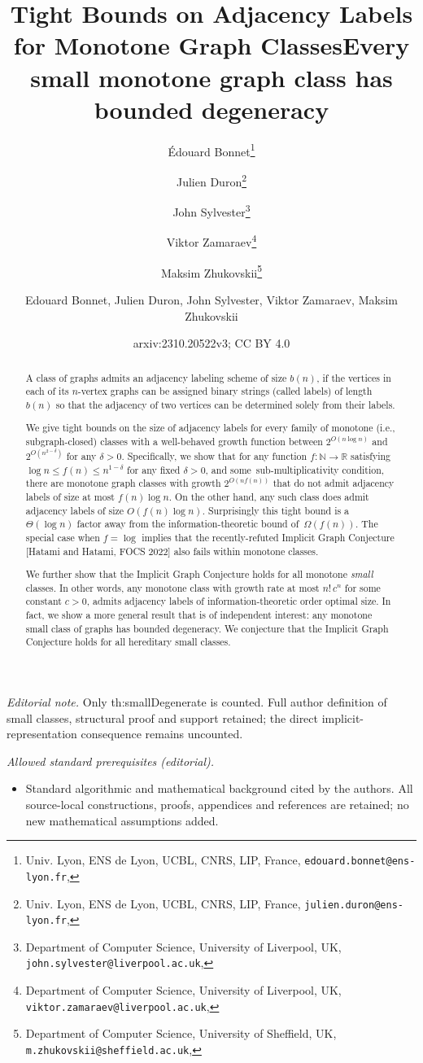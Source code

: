 \documentclass[letterpaper,11pt]{article}
\title{Tight Bounds on Adjacency Labels for Monotone Graph Classes}
\date{}
\author{ }
\author{{\'E}douard Bonnet\thanks{Univ. Lyon, ENS de Lyon, UCBL, CNRS, LIP, France,  \texttt{edouard.bonnet@ens-lyon.fr}, \orcidlink{0000-0002-1653-5822}}    \and Julien Duron\thanks{Univ. Lyon, ENS de Lyon, UCBL, CNRS, LIP, France, \texttt{julien.duron@ens-lyon.fr}, \orcidlink{0009-0004-0925-9438}} \and    John Sylvester\thanks{Department of Computer Science, University of Liverpool, UK, \texttt{john.sylvester@liverpool.ac.uk}, \orcidlink{0000-0002-6543-2934}}
	\and
	Viktor Zamaraev\thanks{Department of Computer Science, University of Liverpool, UK, \texttt{viktor.zamaraev@liverpool.ac.uk}, \orcidlink{0000-0001-5755-4141}}
	\and Maksim Zhukovskii\thanks{Department of Computer Science, University of Sheffield, UK, \texttt{m.zhukovskii@sheffield.ac.uk}, \orcidlink{0000-0001-8763-9533} }}
\title{Every small monotone graph class has bounded degeneracy}
\author{Edouard Bonnet, Julien Duron, John Sylvester, Viktor Zamaraev, Maksim Zhukovskii}
\date{arxiv:2310.20522v3; CC BY 4.0}
\theoremstyle{definition}
\theoremstyle{remark}
\begin{document}
\maketitle
\noindent\textit{Editorial note.} Only th:smallDegenerate is counted. Full author definition of small classes, structural proof and support retained; the direct implicit-representation consequence remains uncounted.\par\medskip
\noindent\textit{Allowed standard prerequisites (editorial).}\begin{itemize}
\item Standard algorithmic and mathematical background cited by the authors. All source-local constructions, proofs, appendices and references are retained; no new mathematical assumptions added.
\end{itemize}\medskip

\begin{abstract}
  A class of graphs admits an adjacency labeling scheme of size $b(n)$, if the vertices in each of its $n$-vertex graphs can be assigned binary strings (called labels) of length $b(n)$ so that the adjacency of two vertices can be determined solely from their labels.
  
  We give tight bounds on the size of adjacency labels for every family of monotone (i.e., subgraph-closed) classes with a well-behaved growth function between $2^{O(n \log n)}$ and $2^{O(n^{2-\delta})}$ for any $\delta > 0$.
  Specifically, we show that for any function $f: \mathbb N \to \mathbb R$ satisfying $\log n \leqslant f(n) \leqslant n^{1-\delta}$ for any fixed $\delta > 0$, and some~sub-multiplicativity condition, there are monotone graph classes with growth $2^{O(nf(n))}$ that do not admit adjacency labels of size at most $f(n) \log n$.
  On the other hand, any such class does admit adjacency labels of size $O(f(n)\log n)$.
  Surprisingly this tight bound is a $\Theta(\log n)$ factor away from the information-theoretic bound of~$\Omega(f(n))$.
  The special case when $f = \log$ implies that the recently-refuted Implicit Graph Conjecture [Hatami and Hatami, FOCS 2022] also fails within monotone classes. 
  
We further show that the Implicit Graph Conjecture holds for all monotone \emph{small} classes. In other words, any monotone class with growth rate at most $n!\,c^n$ for some constant $c>0$, admits adjacency labels of information-theoretic order optimal size. In fact, we show a more general result that is of independent interest: any monotone small class of graphs has bounded degeneracy.
  We conjecture that the Implicit Graph Conjecture holds for all hereditary small classes.
\end{abstract}
\end{document}
